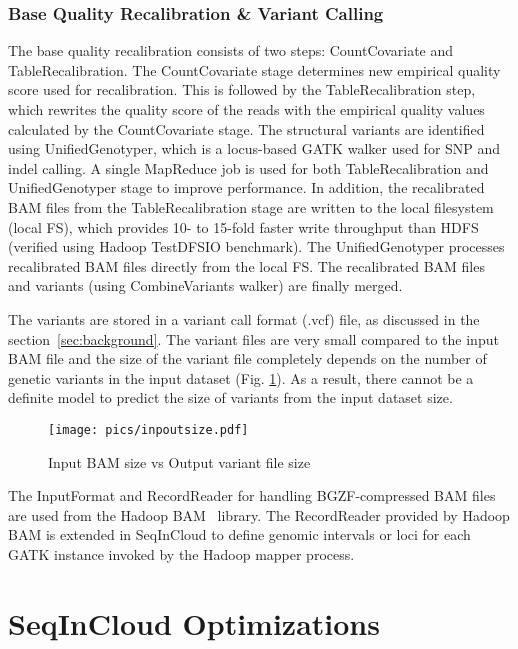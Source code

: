 \subsubsection{Base Quality Recalibration \& Variant Calling}

The base quality recalibration consists of two steps: CountCovariate and TableRecalibration. The CountCovariate stage determines new empirical quality score used for recalibration. This is followed by the TableRecalibration step, which rewrites the quality score of the reads with the empirical quality values calculated by the CountCovariate stage. The structural variants are identified using UnifiedGenotyper, which is a locus-based GATK walker used for SNP and indel calling. A single MapReduce job is used for both TableRecalibration and UnifiedGenotyper stage to improve performance. In addition, the recalibrated BAM files from the TableRecalibration stage are written to the local filesystem (local FS), which provides 10- to 15-fold faster write throughput than HDFS (verified using Hadoop TestDFSIO benchmark). The UnifiedGenotyper processes recalibrated BAM files directly from the local FS. The recalibrated BAM files and variants (using CombineVariants walker) are finally merged. 

The variants are stored in a variant call format (.vcf) file, as discussed in the section~\ref{sec:background}. The variant files are very small compared to the input BAM file and the size of the variant file completely depends on the number of genetic variants in the input dataset (Fig. \ref{fig:inpoutsize}). As a result, there cannot be a definite model to predict the size of variants from the input dataset size. 

\begin{figure}[!htb]
  \centering
  \texttt{[image: pics/inpoutsize.pdf]}
  \caption{Input BAM size vs Output variant file size}
  \label{fig:inpoutsize}
\end{figure}

The InputFormat and RecordReader for handling BGZF-compressed BAM files are used from the Hadoop BAM~\cite{hbam} library. The RecordReader provided by Hadoop BAM is extended in SeqInCloud to define genomic intervals or loci for each GATK instance invoked by the Hadoop mapper process.

\section{SeqInCloud Optimizations}
\label{sec:optimizations}

